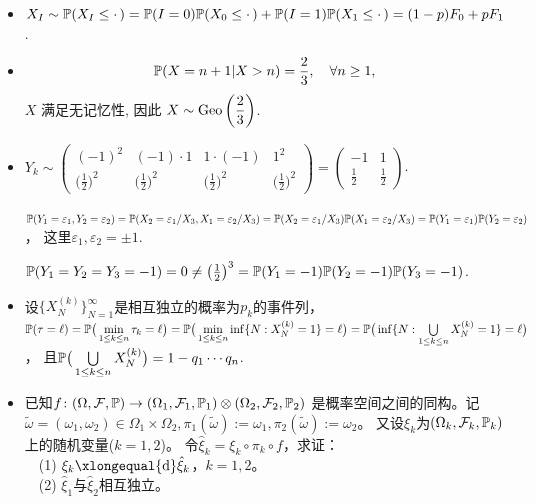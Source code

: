 \begin{itemize}
    \item[5.14]
    $X_I\sim\mathbb{P}(X_I\le\cdot\,)=\mathbb{P}(I=0)\mathbb{P}(X_0\le\cdot\,)+\mathbb{P}(I=1)\mathbb{P}(X_1\le\cdot\,)
    =(1-p)F_0+pF_1$.

    \item[5.21]
    \[
        \mathbb{P}(X = n+1 | X > n) = \frac 2 3, \quad \forall n \ge 1,
    \]
    $X$ 满足无记忆性, 因此 $X \sim \operatorname{Geo}\left( \dfrac 2 3 \right)$.

    \item[5.23]
    $Y_k\sim\begin{pmatrix}(-1)^2&(-1)\cdot1&1\cdot(-1)&1^2\\
        \big(\frac{1}{2}\big)^2&\big(\frac{1}{2}\big)^2&
        \big(\frac{1}{2}\big)^2&\big(\frac{1}{2}\big)^2
    \end{pmatrix}=\begin{pmatrix}-1&1\\
        \frac{1}{2}&\frac{1}{2}
    \end{pmatrix}$.

    $\mathbb{P}(Y_1=\varepsilon_1,Y_2=\varepsilon_2)
    =\mathbb{P}(X_2=\varepsilon_1/X_3,X_1=\varepsilon_2/X_3)
    =\mathbb{P}(X_2=\varepsilon_1/X_3)\mathbb{P}(X_1=\varepsilon_2/X_3)
    =\mathbb{P}(Y_1=\varepsilon_1)\mathbb{P}(Y_2=\varepsilon_2)$，
    这里$\varepsilon_1,\varepsilon_2=\pm1$.

    $\mathbb{P}(Y_1=Y_2=Y_3=-1)=0\ne\big(\frac{1}{2}\big)^3
    =\mathbb{P}(Y_1=-1)\mathbb{P}(Y_2=-1)\mathbb{P}(Y_3=-1)$.

    \item[5.26]
    设$\{X_N^{(k)}\}_{N=1}^\infty$是相互独立的概率为$p_k$的事件列，
    $\mathbb{P}(\tau=\ell)=\mathbb{P}\big(\min\limits_{1\le k\le n}\tau_k=\ell\big)
    =\mathbb{P}\big(\min\limits_{1\le k\le n}\inf\{N:X_N^{(k)}=1\}=\ell\big)
    =\mathbb{P}\big(\inf\{N:\bigcup\limits_{1\le k\le n}X_N^{(k)}=1\}=\ell\big)$，
    且$\mathbb{P}\big(\bigcup\limits_{1\le k\le n}X_N^{(k)}\big)=1-q_1\cdots q_n$.

    \item[$\boxed{习题}$]
    已知$f\colon(\Omega,\mathcal{F},\mathbb{P})\to
    (\Omega_1,\mathcal{F}_1,\mathbb{P}_1)\otimes(\Omega_2,\mathcal{F}_2,\mathbb{P}_2)$
    是概率空间之间的同构。记$\tilde{\omega}=(\omega_1,\omega_2)\in\Omega_1\times\Omega_2,
    \pi_1(\tilde{\omega}):=\omega_1,\pi_2(\tilde{\omega}):=\omega_2$。
    又设$\xi_k$为$(\Omega_k,\mathcal{F}_k,\mathbb{P}_k)$上的随机变量($k=1,2$)。
    令$\hat{\xi}_k=\xi_k\circ\pi_k\circ f$，求证：\\
    \ \ (1) $\xi_k\xlongequal{\rm d}\hat{\xi}_k$，$k=1,2$。\\
    \ \ (2) $\hat{\xi}_1$与$\hat{\xi}_2$相互独立。


\end{itemize}
